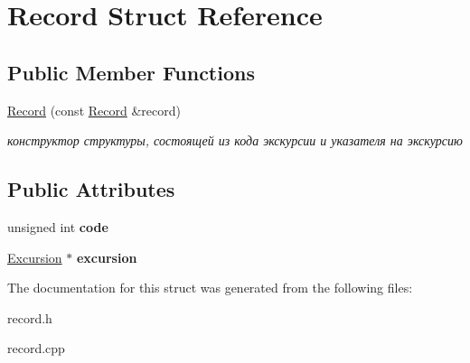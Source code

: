 \hypertarget{struct_record}{}\section{Record Struct Reference}
\label{struct_record}
\subsection*{Public Member Functions}
\begin{DoxyCompactItemize}
\item 
\hypertarget{struct_record_a55324487fe8ddb6d260feba8864cc7eb}{}\hyperlink{struct_record_a55324487fe8ddb6d260feba8864cc7eb}{Record} (const \hyperlink{struct_record}{Record} \&record)\label{struct_record_a55324487fe8ddb6d260feba8864cc7eb}

\begin{DoxyCompactList}\small\item\em конструктор структуры, состоящей из кода экскурсии и указателя на экскурсию \end{DoxyCompactList}\end{DoxyCompactItemize}
\subsection*{Public Attributes}
\begin{DoxyCompactItemize}
\item 
\hypertarget{struct_record_ae50469fdf54274743b79f79346b1379a}{}unsigned int {\bfseries code}\label{struct_record_ae50469fdf54274743b79f79346b1379a}

\item 
\hypertarget{struct_record_a614dffcf1864b1dee1902ff78dce681b}{}\hyperlink{class_excursion}{Excursion} $\ast$ {\bfseries excursion}\label{struct_record_a614dffcf1864b1dee1902ff78dce681b}

\end{DoxyCompactItemize}


The documentation for this struct was generated from the following files\+:\begin{DoxyCompactItemize}
\item 
record.\+h\item 
record.\+cpp\end{DoxyCompactItemize}
